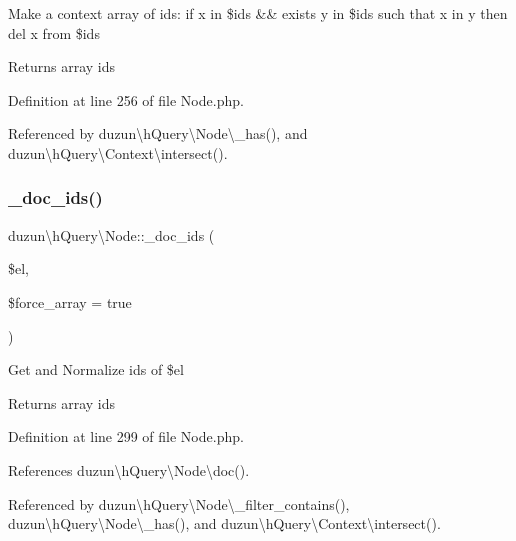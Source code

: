 Make a context array of ids\+: if x in \$ids \&\& exists y in \$ids such that x in y then del x from \$ids

\begin{DoxyReturn}{Returns}
array ids 
\end{DoxyReturn}


Definition at line 256 of file Node.\+php.



Referenced by duzun\textbackslash{}h\+Query\textbackslash{}\+Node\textbackslash{}\+\_\+has(), and duzun\textbackslash{}h\+Query\textbackslash{}\+Context\textbackslash{}intersect().

\mbox{\label{classduzun_1_1hQuery_1_1Node_a3d9fe0b2908818d7d8feef2e55405d03}} 
\subsubsection{\texorpdfstring{\+\_\+doc\+\_\+ids()}{\_doc\_ids()}}
{\footnotesize\ttfamily duzun\textbackslash{}h\+Query\textbackslash{}\+Node\+::\+\_\+doc\+\_\+ids (\begin{DoxyParamCaption}\item[{}]{\$el,  }\item[{}]{\$force\+\_\+array = {\ttfamily true} }\end{DoxyParamCaption})\hspace{0.3cm}{\ttfamily [protected]}}

Get and Normalize ids of \$el

\begin{DoxyReturn}{Returns}
array ids 
\end{DoxyReturn}


Definition at line 299 of file Node.\+php.



References duzun\textbackslash{}h\+Query\textbackslash{}\+Node\textbackslash{}doc().



Referenced by duzun\textbackslash{}h\+Query\textbackslash{}\+Node\textbackslash{}\+\_\+filter\+\_\+contains(), duzun\textbackslash{}h\+Query\textbackslash{}\+Node\textbackslash{}\+\_\+has(), and duzun\textbackslash{}h\+Query\textbackslash{}\+Context\textbackslash{}intersect().

